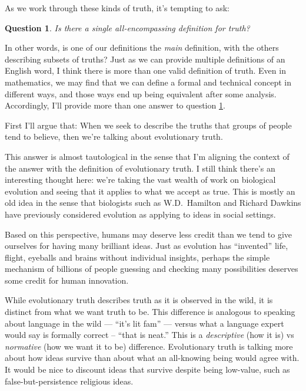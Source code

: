 \documentclass[11pt, oneside]{article}   	%
\newenvironment{answer}[1]
  {\renewcommand\theinnercustomthm{#1}\innercustomthm}
  {\endinnercustomthm}
\newtheorem{question}{Question}
\begin{document}
As we work through these kinds of truth, it's tempting to ask:
\begin{question}\label{q2}
    Is there a single all-encompassing definition for truth?
\end{question}
In other words, is one of our definitions the {\em main} definition, with the
others describing subsets of truths?
Just as we can provide multiple definitions of an English word, I think there
is more than one valid definition of truth. Even in mathematics, we may find
that we can define a formal and technical concept in different ways, and those
ways end up being equivalent after some analysis.
Accordingly, I'll provide more than one answer to question \ref{q2}.

First I'll argue that:
\begin{answer}{3a.}
    When we seek to describe the truths that groups of people tend to believe,
    then we're talking about evolutionary truth.
\end{answer}

This answer is almost tautological in the sense that I'm aligning the context of
the answer with the definition of evolutionary truth. I still think there's
an interesting thought here: we're taking the vast wealth of work on
biological evolution and seeing that it applies to what we accept as true. This
is mostly an old idea in the sense that biologists such as W.D.~Hamilton and
Richard Dawkins have previously considered evolution as applying to ideas in
social settings.

Based on this perspective, humans
may deserve less credit than we tend to give ourselves for having many
brilliant ideas. Just as evolution has ``invented'' life, flight, eyeballs and
brains without individual insights, perhaps the simple mechanism of billions of
people guessing and checking many possibilities deserves some
credit for human innovation.

While evolutionary truth describes truth as it is observed in the wild, it is
distinct from what we want truth to be. This difference is analogous to speaking
about language in the wild --- ``it's lit fam'' --- versus what a language
expert would say is formally correct -- ``that is neat.''
This is a {\em
descriptive} (how it is) vs {\em normative} (how we want it to be) difference.
Evolutionary truth is talking more
about how ideas survive than about what an all-knowing being would agree with.
It would be nice to discount ideas that survive despite being low-value, such as
false-but-persistence religious ideas.
\end{document}

